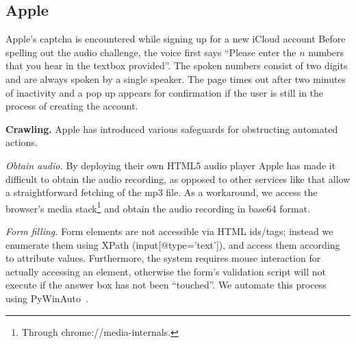 \subsection{Apple}

Apple's captcha is encountered while signing up for a new iCloud account 
Before spelling out the audio challenge, 
the voice first says ``Please enter the $n$ numbers that you hear in the textbox provided''. The 
spoken numbers consist of two digits and are always spoken by a single speaker.
The page times out after two minutes of inactivity and a pop up appears for confirmation if the user is 
still in the process of creating the account. 


\textbf{Crawling.} Apple has introduced various safeguards for obstructing automated actions.

\emph{Obtain audio.} By deploying their own HTML5 audio player Apple has made it 
difficult to obtain the audio recording, as opposed to other services like \re
that allow a straightforward fetching of the mp3 file. As a workaround, we access 
the browser's media stack\footnote{Through chrome://media-internals.} and obtain the 
audio recording in base64 format.

\emph{Form filling.} Form elements are not accessible via HTML ids/tags; instead we enumerate them 
using XPath (input[@type='text']), and access them according to attribute values.
Furthermore, the system requires mouse interaction for actually accessing an element, otherwise the 
form's validation script will not execute if the answer box has not been ``touched''. We automate this 
process using PyWinAuto~\cite{pywinauto}.

